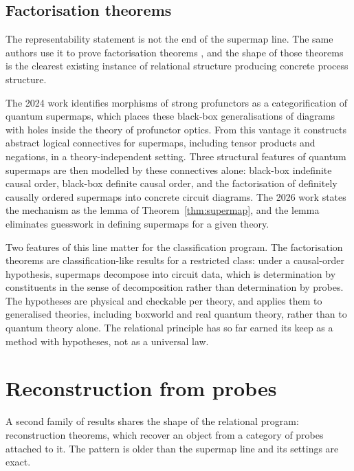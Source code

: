 \documentclass[11pt,letterpaper]{article}
\theoremstyle{definition}
\theoremstyle{remark}
\begin{document}
\subsection{Factorisation theorems}
\label{sec:factorisation}

The representability statement is not the end of the supermap line. The same authors use it to prove factorisation theorems \cite{hw}, and the shape of those theorems is the clearest existing instance of relational structure producing concrete process structure.

The 2024 work \cite{hw} identifies morphisms of strong profunctors as a categorification of quantum supermaps, which places these black-box generalisations of diagrams with holes inside the theory of profunctor optics. From this vantage it constructs abstract logical connectives for supermaps, including tensor products and negations, in a theory-independent setting. Three structural features of quantum supermaps are then modelled by these connectives alone: black-box indefinite causal order, black-box definite causal order, and the factorisation of definitely causally ordered supermaps into concrete circuit diagrams. The 2026 work \cite{whh} states the mechanism as the lemma of Theorem~\ref{thm:supermap}, and the lemma eliminates guesswork in defining supermaps for a given theory.

Two features of this line matter for the classification program. The factorisation theorems are classification-like results for a restricted class: under a causal-order hypothesis, supermaps decompose into circuit data, which is determination by constituents in the sense of decomposition rather than determination by probes. The hypotheses are physical and checkable per theory, and \cite{whh} applies them to generalised theories, including boxworld and real quantum theory, rather than to quantum theory alone. The relational principle has so far earned its keep as a method with hypotheses, not as a universal law.

\section{Reconstruction from probes}
\label{sec:reconstruction}

A second family of results shares the shape of the relational program: reconstruction theorems, which recover an object from a category of probes attached to it. The pattern is older than the supermap line and its settings are exact.
\end{document}
